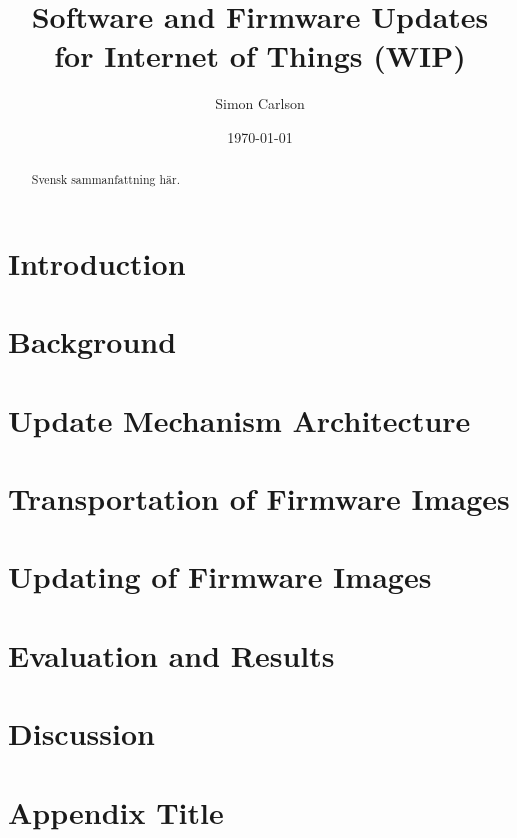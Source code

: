 \documentclass{kththesis}
\title{Software and Firmware Updates for Internet of Things (WIP)}
\author{Simon Carlson}
\date{\today}
\begin{document}
\frontmatter

\titlepage

\begin{abstract}

\end{abstract}


\begin{otherlanguage}{swedish}
    \begin{abstract}
        Svensk sammanfattning här.
    \end{abstract}
\end{otherlanguage}


\tableofcontents
\listoftables
\listoffigures
\lstlistoflistings
\printglossaries

\mainmatter


\chapter{Introduction}


\chapter{Background}


\chapter{Update Mechanism Architecture}


\chapter{Transportation of Firmware Images}

\chapter{Updating of Firmware Images}


\chapter{Evaluation and Results}


\chapter{Discussion}


\printbibliography[heading=bibintoc] %

\appendix

\chapter{Appendix Title}
\end{document}
